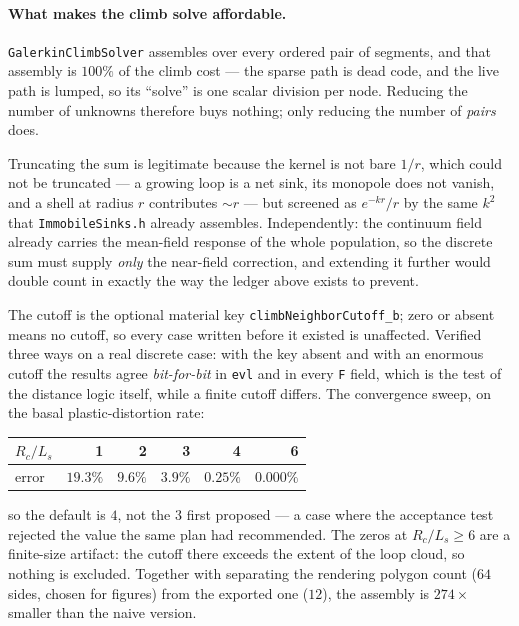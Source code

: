 \documentclass[11pt,a4paper]{article}
\newcommand{\code}[1]{\texttt{\small #1}}
\begin{document}
\paragraph{What makes the climb solve affordable.} \code{GalerkinClimbSolver}
assembles over every ordered pair of segments, and that assembly is $100\%$ of
the climb cost --- the sparse path is dead code, and the live path is lumped, so
its ``solve'' is one scalar division per node. Reducing the number of unknowns
therefore buys nothing; only reducing the number of \emph{pairs} does.

Truncating the sum is legitimate because the kernel is not bare $1/r$, which
could not be truncated --- a growing loop is a net sink, its monopole does not
vanish, and a shell at radius $r$ contributes $\sim r$ --- but screened as
$e^{-kr}/r$ by the same $k^2$ that \code{ImmobileSinks.h} already assembles.
Independently: the continuum field already carries the mean-field response of
the whole population, so the discrete sum must supply \emph{only} the near-field
correction, and extending it further would double count in exactly the way the
ledger above exists to prevent.

The cutoff is the optional material key \code{climbNeighborCutoff\_b}; zero or
absent means no cutoff, so every case written before it existed is unaffected.
Verified three ways on a real discrete case: with the key absent and with an
enormous cutoff the results agree \emph{bit-for-bit} in \code{evl} and in every
\code{F} field, which is the test of the distance logic itself, while a finite
cutoff differs. The convergence sweep, on the basal plastic-distortion rate:

\begin{center}
\begin{tabular}{lrrrrr}
\toprule
$R_c/L_s$ & 1 & 2 & 3 & 4 & 6 \\
\midrule
error & $19.3\%$ & $9.6\%$ & $3.9\%$ & $0.25\%$ & $0.000\%$ \\
\bottomrule
\end{tabular}
\end{center}

\noindent
so the default is $4$, not the $3$ first proposed --- a case where the
acceptance test rejected the value the same plan had recommended. The zeros at
$R_c/L_s \geq 6$ are a finite-size artifact: the cutoff there exceeds the extent
of the loop cloud, so nothing is excluded. Together with separating the
rendering polygon count ($64$ sides, chosen for figures) from the exported one
($12$), the assembly is $274\times$ smaller than the naive version.
\end{document}
